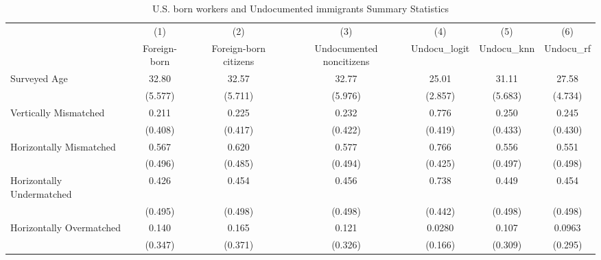 \begin{table}[htbp]\centering
\def\sym#1{\ifmmode^{#1}\else\(^{#1}\)\fi}
\caption{U.S. born workers and Undocumented immigrants Summary Statistics \label{tab:sum}}
\begin{tabular}{l*{6}{c}}
\hline\hline
                    &\multicolumn{1}{c}{(1)}         &\multicolumn{1}{c}{(2)}         &\multicolumn{1}{c}{(3)}         &\multicolumn{1}{c}{(4)}         &\multicolumn{1}{c}{(5)}         &\multicolumn{1}{c}{(6)}         \\
                    &Foreign-born         &Foreign-born citizens         &Undocumented noncitizens         &Undocu\_logit         &  Undocu\_knn         &   Undocu\_rf         \\
\hline
Surveyed Age        &       32.80         &       32.57         &       32.77         &       25.01         &       31.11         &       27.58         \\
                    &     (5.577)         &     (5.711)         &     (5.976)         &     (2.857)         &     (5.683)         &     (4.734)         \\
[1em]
Vertically Mismatched&       0.211         &       0.225         &       0.232         &       0.776         &       0.250         &       0.245         \\
                    &     (0.408)         &     (0.417)         &     (0.422)         &     (0.419)         &     (0.433)         &     (0.430)         \\
[1em]
Horizontally Mismatched&       0.567         &       0.620         &       0.577         &       0.766         &       0.556         &       0.551         \\
                    &     (0.496)         &     (0.485)         &     (0.494)         &     (0.425)         &     (0.497)         &     (0.498)         \\
[1em]
Horizontally Undermatched&       0.426         &       0.454         &       0.456         &       0.738         &       0.449         &       0.454         \\
                    &     (0.495)         &     (0.498)         &     (0.498)         &     (0.442)         &     (0.498)         &     (0.498)         \\
[1em]
Horizontally Overmatched&       0.140         &       0.165         &       0.121         &      0.0280         &       0.107         &      0.0963         \\
                    &     (0.347)         &     (0.371)         &     (0.326)         &     (0.166)         &     (0.309)         &     (0.295)         \\

\end{tabular}
\end{table}
